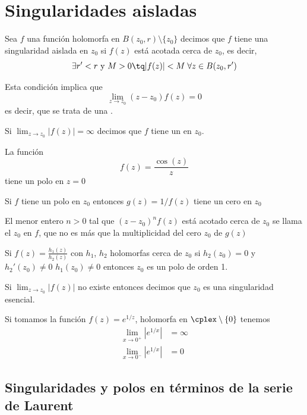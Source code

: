 \documentclass{apuntes}
\begin{document}
\section{Singularidades aisladas}

\begin{defn}
Sea $f$ una función holomorfa en $B(z_0,r)\setminus\{z_0\}$ decimos que $f$ tiene una singularidad aislada en $z_0$ si $f(z)$ está acotada cerca de $z_0$, es decir,
\[\exists r'<r \text{ y } M>0 \tq |f(z)| < M\; \forall z \in B(z_0, r')\]

Esta condición implica que
\[\lim_{z \to z_0}(z-z_0)f(z)=0\]
es decir, que se trata de una .
\end{defn}

Si $\lim_{z \to z_0}|f(z)|=\infty$ decimos que $f$ tiene un  en $z_0$.

\begin{example}
La función
\[f(z)=\frac{\cos(z)}{z}\]
tiene un polo en $z=0$
\end{example}

\obs Si $f$ tiene un polo en $z_0$ entonces $g(z)=1/f(z)$ tiene un cero en $z_0$

El menor entero $n>0$ tal que $(z-z_0)^nf(z)$ está acotado cerca de $z_0$ se llama el  $z_0$ en $f$, que no es más que la multiplicidad del cero $z_0$ de $g(z)$

\obs Si $f(z)=\frac{h_1(z)}{h_2(z)}$ con $h_1$, $h_2$ holomorfas cerca de $z_0$ si $h_2(z_0)=0$ y $h_2'(z_0)\neq 0$ $h_1(z_0)\neq 0$ entonces $z_0$ es un polo de orden 1.

\begin{defn}
Si $\lim_{z \to z_0} |f(z)|$ no existe entonces decimos que $z_0$ es una singularidad esencial.
\end{defn}

\begin{example}
Si tomamos la función $f(z)=e^{1/z}$, holomorfa en $\cplex \setminus \{0\}$ tenemos
\begin{align}
\lim_{x \to 0^+}|e^{1/x}| &=\infty\\
\lim_{x \to 0^-}|e^{1/x}| &=0
\end{align}
\end{example}

\subsection{Singularidades y polos en términos de la serie de Laurent}
\end{document}
